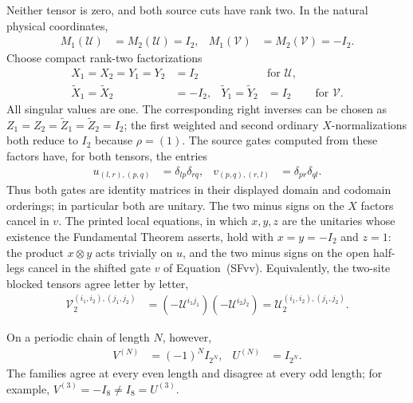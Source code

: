 \documentclass{article}
\begin{document}
Neither tensor is zero, and both source cuts have rank two. In the natural physical coordinates,
\begin{align}
    M_1(\mathcal U) & =M_2(\mathcal U)=I_2,  &
    M_1(\mathcal V) & =M_2(\mathcal V)=-I_2.
    \label{eq:mpu_standard_form_parity_gap_1}
\end{align}
Choose compact rank-two factorizations
\begin{align}
    X_1=X_2=Y_1=Y_2               & =I_2
                                  &        & \text{for }\mathcal U,
    \label{eq:mpu_standard_form_parity_gap_2}                       \\
    \widetilde X_1=\widetilde X_2 & =-I_2, &
    \widetilde Y_1=\widetilde Y_2 & =I_2
                                  &        & \text{for }\mathcal V.
    \label{eq:mpu_standard_form_parity_gap_3}
\end{align}
All singular values are one. The corresponding right inverses can be chosen as
$Z_1=Z_2=\widetilde Z_1=\widetilde Z_2=I_2$; the first weighted and second
ordinary $X$-normalizations both reduce to $I_2$ because $\rho=(1)$.
The source gates computed from these factors have, for both tensors, the entries
\begin{align}
    u_{(l,r),(p,q)} & =\delta_{lp}\delta_{rq}, &
    v_{(p,q),(r,l)} & =\delta_{pr}\delta_{ql}.
    \label{eq:mpu_standard_form_parity_gates}
\end{align}
Thus both gates are identity matrices in their displayed domain and codomain
orderings; in particular both are unitary. The two minus signs on the $X$
factors cancel in $v$. The printed local equations, in which $x,y,z$ are the
unitaries whose existence the Fundamental Theorem asserts, hold with
$x=y=-I_2$ and $z=1$: the product $x\otimes y$ acts trivially on
$u$, and the two minus signs on the open half-legs cancel in the shifted gate
$v$ of Equation~(SFvv). Equivalently, the two-site blocked tensors agree
letter by letter,
\begin{align}
    \mathcal V_2^{(i_1,i_2),(j_1,j_2)}
     & =(-\mathcal U^{i_1j_1})(-\mathcal U^{i_2j_2})
    =\mathcal U_2^{(i_1,i_2),(j_1,j_2)}.
    \label{eq:mpu_standard_form_parity_gap_4}
\end{align}

On a periodic chain of length $N$, however,
\begin{align}
    V^{(N)} & =(-1)^N I_{2^N}, & U^{(N)} & =I_{2^N}.
    \label{eq:mpu_standard_form_parity_closed}
\end{align}
The families agree at every even length and disagree at every odd length;
for example, $V^{(3)}=-I_8\ne I_8=U^{(3)}$.
\end{document}
